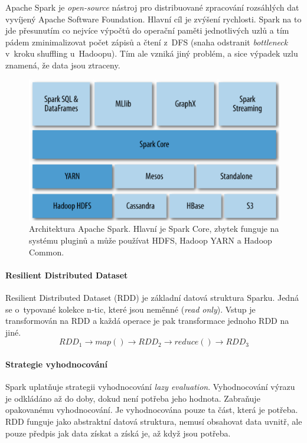 Apache Spark je \textit{open-source} nástroj pro distribuované zpracování rozsáhlých dat vyvíjený Apache Software Foundation. Hlavní cíl je zvýšení rychlosti. Spark na to jde přesunutím co nejvíce výpočtů do operační paměti jednotlivých uzlů a tím pádem zminimalizovat počet zápisů a čtení z~DFS (snaha odstranit \textit{bottleneck} v~kroku shuffling u~Hadoopu). Tím ale vzniká jiný problém, a sice výpadek uzlu znamená, že data jsou ztraceny.

\begin{figure}[H]
    \centering
    \includegraphics[width=0.75\linewidth]{spark.png}
    \caption{Architektura Apache Spark. Hlavní je Spark Core, zbytek funguje na systému pluginů a může používat HDFS, Hadoop YARN a Hadoop Common.}
\end{figure}


\paragraph*{Resilient Distributed Dataset} Resilient Distributed Dataset (RDD) je základní datová struktura Sparku. Jedná se o~typované kolekce n-tic, které jsou neměnné (\textit{read only}). Vstup je transformován na RDD a každá operace je pak transformace jednoho RDD na jiné.
$$
RDD_1 \rightarrow map() \rightarrow RDD_2 \rightarrow reduce() \rightarrow RDD_3
$$

\paragraph*{Strategie vyhodnocování} Spark uplatňuje strategii vyhodnocování \textit{lazy evaluation}. Vyhodnocování výrazu je odkládáno až do doby, dokud není potřeba jeho hodnota. Zabraňuje opakovanému vyhodnocování. Je vyhodnocována pouze ta část, která je potřeba. RDD funguje jako abstraktní datová struktura, nemusí obsahovat data uvnitř, ale pouze předpis jak data získat a získá je, až když jsou potřeba.

